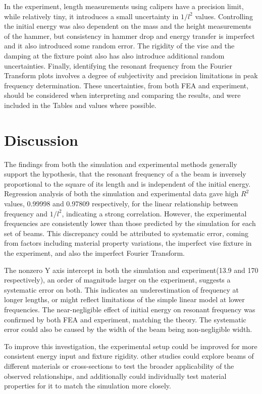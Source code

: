 \documentclass[a4paper,12pt]{article}
\begin{document}
    In the experiment, length measurements using calipers have a precision limit, while relatively tiny, it introduces a small uncertainty in $1/l^2$ values.
    Controlling the initial energy was also dependent on the mass and the height measurements of the hammer, but consistency in hammer drop and energy transfer is imperfect and it also introduced some random error.
    The rigidity of the vise and the damping at the fixture point also has also introduce additional random uncertainties.
    Finally, identifying the resonant frequency from the Fourier Transform plots involves a degree of subjectivity and precision limitations in peak frequency determination.
    These uncertainties, from both FEA and experiment, should be considered when interpreting and comparing the results, and were included in the Tables and values where possible.

\section{Discussion}%

The findings from both the simulation and experimental methods generally support the hypothesis, that the resonant frequency of a the beam is inversely proportional to the square of its length and is independent of the initial energy.  Regression analysis of both the simulation and experimental data gave high $R^2$ values, 0.99998 and 0.97809 respectively, for the linear relationship between frequency and $1/l^2$, indicating a strong correlation. However, the experimental frequencies are consistently lower than those predicted by the simulation for each set of beams. This discrepancy could be attributed to systematic error, coming from factors including material property variations, the imperfect vise fixture in the experiment, and also the imperfect Fourier Transform.

The nonzero Y axis intercept in both the simulation and experiment(13.9 and 170 respectively), an order of magnitude larger on the experiment, suggests a systematic error on both. This indicates an underestimation of frequency at longer lengths, or might reflect limitations of the simple linear model at lower frequencies.
The near-negligible effect of initial energy on resonant frequency was confirmed by both FEA and experiment, matching the theory. The systematic error could also be caused by the width of the beam being non-negligible width.

To improve this investigation, the experimental setup could be improved for more consistent energy input and fixture rigidity. other studies could explore beams of different materials or cross-sections to test the broader applicability of the observed relationships, and additionally could individually test material properties for it to match the simulation more closely.
\end{document}
